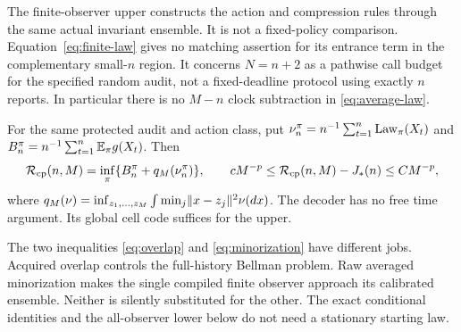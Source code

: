 The finite-observer upper constructs the action and compression rules through the same actual invariant ensemble. It is not a fixed-policy comparison. Equation~\eqref{eq:finite-law} gives no matching assertion for its entrance term in the complementary small-$n$ region. It concerns $N=n+2$ as a pathwise call budget for the specified random audit, not a fixed-deadline protocol using exactly $n$ reports. In particular there is no $M-n$ clock subtraction in \eqref{eq:average-law}.

\begin{corollary}\label{cor:checkpoint}
For the same protected audit and action class, put
$\nu_n^\pi=n^{-1}\sum_{t=1}^n\operatorname{Law}_\pi(X_t)$ and
$B_n^\pi=n^{-1}\sum_{t=1}^n\mathbb E_\pi g(X_t)$. Then
\begin{equation}\label{eq:checkpoint}
 \mathcal R_{\rm cp}(n,M)=\inf_\pi\{B_n^\pi+q_M(\nu_n^\pi)\},\qquad
 cM^{-p}\le\mathcal R_{\rm cp}(n,M)-J_*(n)\le CM^{-p},
\end{equation}
where $q_M(\nu)=\inf_{z_1,\ldots,z_M}\int\min_j\lVert x-z_j\rVert^2\nu(dx)$.
The decoder has no free time argument. Its global cell code suffices for the upper.
\end{corollary}

The two inequalities \eqref{eq:overlap} and \eqref{eq:minorization} have different jobs. Acquired overlap controls the full-history Bellman problem. Raw averaged minorization makes the single compiled finite observer approach its calibrated ensemble. Neither is silently substituted for the other. The exact conditional identities and the all-observer lower below do not need a stationary starting law.
